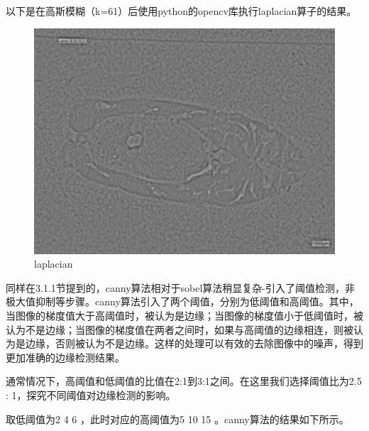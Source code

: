 以下是在高斯模糊（k=61）后使用python的opencv库执行laplacian算子的结果。

\begin{figure}[H]
    \centering
    \begin{minipage}{0.45\textwidth}
        \centering
        \includegraphics[width=\textwidth]{./fig/gausssian/laplacian61.jpg}
        \caption{laplacian}
        \label{fig:laplacian}
    \end{minipage}
\end{figure}

同样在3.1.1节提到的，canny算法相对于sobel算法稍显复杂-引入了阈值检测，非极大值抑制等步骤。canny算法引入了两个阈值，分别为低阈值和高阈值。其中，当图像的梯度值大于高阈值时，被认为是边缘；当图像的梯度值小于低阈值时，被认为不是边缘；当图像的梯度值在两者之间时，如果与高阈值的边缘相连，则被认为是边缘，否则被认为不是边缘。这样的处理可以有效的去除图像中的噪声，得到更加准确的边缘检测结果。

通常情况下，高阈值和低阈值的比值在2:1到3:1之间。在这里我们选择阈值比为2.5 : 1，探究不同阈值对边缘检测的影响。

取低阈值为2 4 6 ，此时对应的高阈值为5 10 15 。canny算法的结果如下所示。

